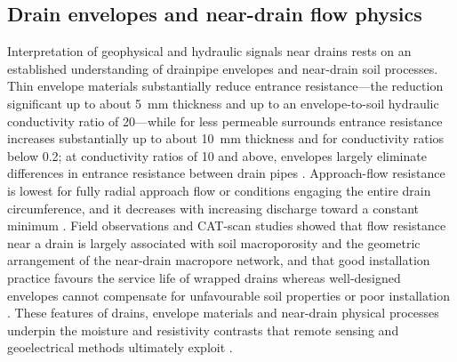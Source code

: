 \subsection{Drain envelopes and near-drain flow physics}

Interpretation of geophysical and hydraulic signals near drains rests on an established understanding of drainpipe envelopes and near-drain soil processes. Thin envelope materials substantially reduce entrance resistance---the reduction significant up to about 5~mm thickness and up to an envelope-to-soil hydraulic conductivity ratio of 20---while for less permeable surrounds entrance resistance increases substantially up to about 10~mm thickness and for conductivity ratios below 0.2; at conductivity ratios of 10 and above, envelopes largely eliminate differences in entrance resistance between drain pipes \parencite{Stuyt2006}. Approach-flow resistance is lowest for fully radial approach flow or conditions engaging the entire drain circumference, and it decreases with increasing discharge toward a constant minimum \parencite{Stuyt2006}. Field observations and CAT-scan studies showed that flow resistance near a drain is largely associated with soil macroporosity and the geometric arrangement of the near-drain macropore network, and that good installation practice favours the service life of wrapped drains whereas well-designed envelopes cannot compensate for unfavourable soil properties or poor installation \parencite{Stuyt2006}. These features of drains, envelope materials and near-drain physical processes underpin the moisture and resistivity contrasts that remote sensing and geoelectrical methods ultimately exploit \parencite{Stuyt2006}.